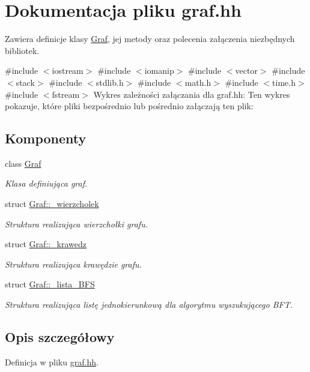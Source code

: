 \hypertarget{graf_8hh}{\section{\-Dokumentacja pliku graf.\-hh}
\label{graf_8hh}
}


\-Zawiera definicje klasy \hyperlink{class_graf}{\-Graf}, jej metody oraz polecenia załączenia niezbędnych bibliotek.  


{\ttfamily \#include $<$iostream$>$}\*
{\ttfamily \#include $<$iomanip$>$}\*
{\ttfamily \#include $<$vector$>$}\*
{\ttfamily \#include $<$stack$>$}\*
{\ttfamily \#include $<$stdlib.\-h$>$}\*
{\ttfamily \#include $<$math.\-h$>$}\*
{\ttfamily \#include $<$time.\-h$>$}\*
{\ttfamily \#include $<$fstream$>$}\*
\-Wykres zależności załączania dla graf.\-hh\-:
\-Ten wykres pokazuje, które pliki bezpośrednio lub pośrednio załączają ten plik\-:
\subsection*{\-Komponenty}
\begin{DoxyCompactItemize}
\item 
class \hyperlink{class_graf}{\-Graf}
\begin{DoxyCompactList}\small\item\em \-Klasa definiująca graf. \end{DoxyCompactList}\item 
struct \hyperlink{struct_graf_1_1__wierzcholek}{\-Graf\-::\-\_\-wierzcholek}
\begin{DoxyCompactList}\small\item\em \-Struktura realizująca wierzchołki grafu. \end{DoxyCompactList}\item 
struct \hyperlink{struct_graf_1_1__krawedz}{\-Graf\-::\-\_\-krawedz}
\begin{DoxyCompactList}\small\item\em \-Struktura realizująca krawędzie grafu. \end{DoxyCompactList}\item 
struct \hyperlink{struct_graf_1_1__lista___b_f_s}{\-Graf\-::\-\_\-lista\-\_\-\-B\-F\-S}
\begin{DoxyCompactList}\small\item\em \-Struktura realizująca listę jednokierunkową dla algorytmu wyszukującego \-B\-F\-T. \end{DoxyCompactList}\end{DoxyCompactItemize}


\subsection{\-Opis szczegółowy}


\-Definicja w pliku \hyperlink{graf_8hh_source}{graf.\-hh}.

